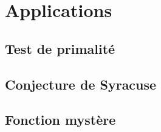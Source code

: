 \section{Applications}
\subsection{Test de primalité}
\setcounter{thequestion}{0}

\subsection{Conjecture de Syracuse}
\setcounter{thequestion}{0}

\subsection{Fonction mystère}
\setcounter{thequestion}{0}

